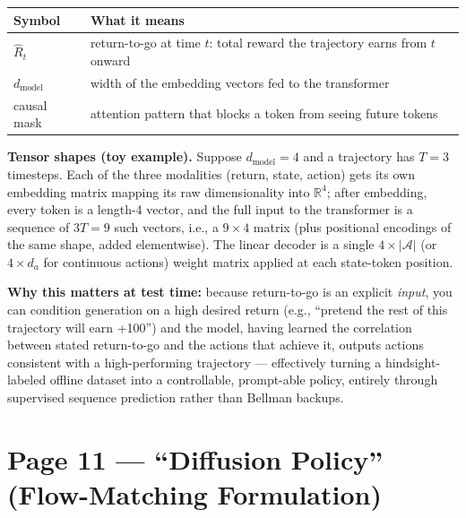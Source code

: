 \documentclass[11pt]{article}
\begin{document}
\begin{center}
\begin{tabular}{@{}ll@{}}
\toprule
Symbol & What it means \\
\midrule
$\hat R_t$ & return-to-go at time $t$: total reward the trajectory earns from $t$ onward \\
$d_{\text{model}}$ & width of the embedding vectors fed to the transformer \\
causal mask & attention pattern that blocks a token from seeing future tokens \\
\bottomrule
\end{tabular}
\end{center}

\textbf{Tensor shapes (toy example).} Suppose $d_{\text{model}}=4$ and a trajectory has $T=3$ timesteps. Each of the three modalities (return, state, action) gets its own embedding matrix mapping its raw dimensionality into $\mathbb{R}^4$; after embedding, every token is a length-4 vector, and the full input to the transformer is a sequence of $3T = 9$ such vectors, i.e., a $9\times 4$ matrix (plus positional encodings of the same shape, added elementwise). The linear decoder is a single $4 \times |\mathcal{A}|$ (or $4\times d_a$ for continuous actions) weight matrix applied at each state-token position.

\textbf{Why this matters at test time:} because return-to-go is an explicit \emph{input}, you can condition generation on a high desired return (e.g., ``pretend the rest of this trajectory will earn +100'') and the model, having learned the correlation between stated return-to-go and the actions that achieve it, outputs actions consistent with a high-performing trajectory --- effectively turning a hindsight-labeled offline dataset into a controllable, prompt-able policy, entirely through supervised sequence prediction rather than Bellman backups.

\section*{Page 11 --- ``Diffusion Policy'' (Flow-Matching Formulation)}
\end{document}
